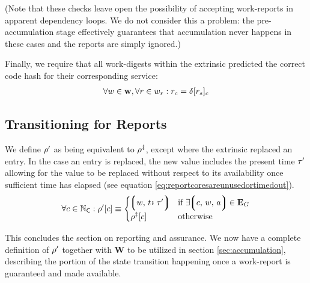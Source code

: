 (Note that these checks leave open the possibility of accepting work-reports in apparent dependency loops. We do not consider this a problem: the pre-accumulation stage effectively guarantees that accumulation never happens in these cases and the reports are simply ignored.)

Finally, we require that all work-digests within the extrinsic predicted the correct code hash for their corresponding service:
\begin{align}\label{eq:reportcodesarecorrect}
  \forall w \in \mathbf{w}, \forall r \in w_r : r_c = \delta[r_s]_c
\end{align}









\subsection{Transitioning for Reports}

We define $\rho'$ as being equivalent to $\rho^\ddagger$, except where the extrinsic replaced an entry. In the case an entry is replaced, the new value includes the present time $\tau'$ allowing for the value to be replaced without respect to its availability once sufficient time has elapsed (see equation \ref{eq:reportcoresareunusedortimedout}).
\begin{equation}
    \forall c \in \coreindex : \reportspostassurances[c] \equiv \begin{cases}
      \tup{w,\,\is{t}{\thetime'}} &\when \exists \tup{c,\,w,\,a} \in \xtguarantees \\
      \reportspostguarantees[c] &\otherwise
    \end{cases}
\end{equation}

This concludes the section on reporting and assurance. We now have a complete definition of $\rho'$ together with $\mathbf{W}$ to be utilized in section \ref{sec:accumulation}, describing the portion of the state transition happening once a work-report is guaranteed and made available.

